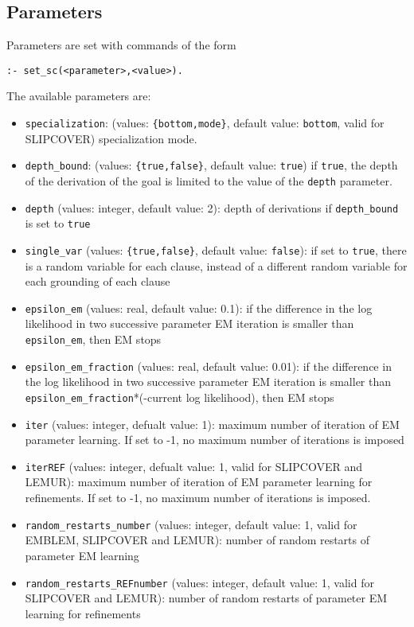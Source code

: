 \subsection{Parameters}
Parameters are set with  commands of the form
\begin{verbatim}
:- set_sc(<parameter>,<value>).
\end{verbatim}
The available parameters are:
\begin{itemize}
\item \verb|specialization|: (values: \verb|{bottom,mode}|,  default value: \texttt{bottom}, valid for SLIPCOVER) specialization mode. 
\item \verb|depth_bound|: (values: \verb|{true,false}|,  default value: \texttt{true}) if \texttt{true}, the depth of the derivation of the goal is limited to the value of the \texttt{depth} parameter. 
\item \verb|depth| (values: integer, default value: 2): depth of derivations if  \verb|depth_bound|  is set to \verb|true|
\item \verb|single_var| (values: \verb|{true,false}|, default value: \verb|false|): if set to \verb|true|, there is a random variable for each clause, instead of a different random variable for each grounding of each clause
\item \verb|epsilon_em| (values: real, default value: 0.1): if the difference in the log likelihood in two successive parameter EM iteration is smaller
than \verb|epsilon_em|, then EM stops 
\item \verb|epsilon_em_fraction| (values: real, default value: 0.01): if the difference in the log likelihood in two successive parameter EM iteration is smaller
than \verb|epsilon_em_fraction|*(-current log likelihood), then EM stops
\item \verb|iter| (values: integer, defualt value: 1): maximum number of iteration of EM parameter learning. If set to -1, no maximum number of iterations is imposed
\item \verb|iterREF| (values: integer, defualt value: 1, valid for  
 SLIPCOVER and LEMUR):
 maximum number of iteration of EM parameter learning for refinements. If set to -1, no maximum number of iterations is imposed.
\item \verb|random_restarts_number| (values: integer, default value: 1, valid for EMBLEM, SLIPCOVER and LEMUR): number of random restarts of parameter EM learning
\item \verb|random_restarts_REFnumber| (values: integer, default value: 1, valid for  SLIPCOVER and LEMUR): number of random restarts of parameter EM learning for refinements

\end{itemize}
